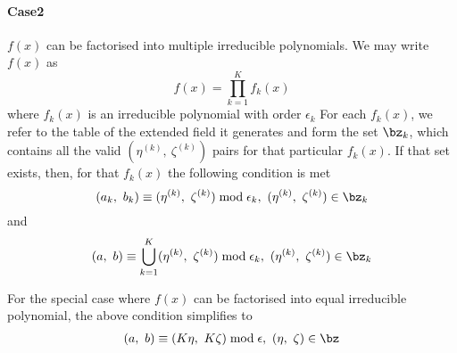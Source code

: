

\paragraph{Case2}$f(x)$ can be factorised into multiple irreducible polynomials. \newline
We may write $f(x)$ as $$f(x)=\prod_{k=1}^{K}f_k(x)$$ where $f_k(x)$ is an irreducible polynomial with order $\epsilon_k$
For each $f_k(x)$, we refer to the table of the extended field it generates and form the set $\bz_k$, which contains all the valid $(\eta^{(k)},~\zeta^{(k)})$ pairs for that particular $f_k(x)$. If that set exists, then, for that $f_k(x)$ the following condition is met
\begin{equation}
(a_k,~b_k) \equiv (\eta^{(k)},~\zeta^{(k)}) \bmod \epsilon_k,~(\eta^{(k)},~\zeta^{(k)})\in \bz_k
\end{equation}
and 
\begin{equation}
(a,~b) \equiv \bigcup_{k=1}^{K} (\eta^{(k)},~\zeta^{(k)}) \bmod \epsilon_k,~(\eta^{(k)},~\zeta^{(k)})\in \bz_k
\end{equation}

For the special case where $f(x)$ can be factorised into equal irreducible polynomial, the above condition simplifies to 
 \begin{equation*}
 \begin{split}
 &(a,~b) \equiv (K\eta,~K\zeta) \bmod \epsilon,~(\eta,~\zeta) \in \bz \\
 \end{split}
 \end{equation*}
 
